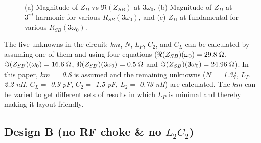 \documentclass[conference]{IEEEtran}
\begin{document}
\begin{figure}[!t]
\begin{subfigure}{0.5\textwidth}
\caption{}
\label{fig:Design_A_Rn_var_1H}
\end{subfigure}
\caption{(a) Magnitude of $Z_{D}$ vs $\Re(Z_{SB})$ at $3\omega_0$, (b) Magnitude of $Z_D$ at $3^{rd}$ harmonic for various $R_{SB}(3\omega_0)$, and (c) $Z_D$ at fundamental for various $R_{SB}(3\omega_0)$.}
\label{fig:Design_A_Rn_var}
\vspace{-0.2in}
\end{figure}

The five unknowns in the circuit: $km$, $N$, $L_P$, $C_2$, and $C_L$ can be calculated by assuming one of them and using four equations ($\Re(Z_{SB})(\omega_0) =  29.8\hspace{1mm} \Omega$, $\Im(Z_{SB})(\omega_0) = 16.6\hspace{1mm}\Omega$, $\Re(Z_{SB})(3\omega_0) = 0.5\hspace{1mm}\Omega$ and  $\Im(Z_{SB})(3\omega_0) = 24.96\hspace{1mm}\Omega$). In this paper, $km =$ \textit{0.8} is assumed and the remaining unknowns ($N =$ \textit{1.34}, $L_P =$ \textit{2.2 nH}, $C_L =$ \textit{0.9 pF}, $C_2 =$ \textit{1.5 pF}, $L_2 =$ \textit{0.73 nH}) are calculated. The $km$ can be varied to get different sets of results in which $L_P$ is minimal and thereby making it layout friendly.


\subsection{Design B (no RF choke \& no $L_2C_2$)}
\end{document}
